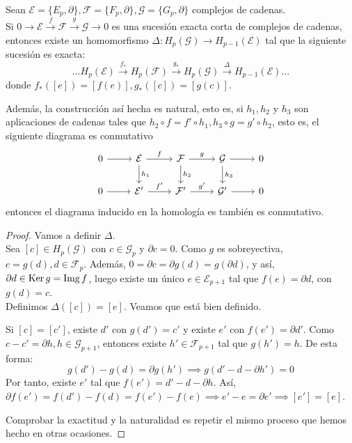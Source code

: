 \begin{theorem}
  Sean $\mathcal{E} = \{E_p, \partial\}, \mathcal{F} = \{F_p, \partial\}, \mathcal{G} = \{G_p, \partial\}$ complejos de cadenas. \\
  Si $0 \to \mathcal{E} \xrightarrow{f} \mathcal{F} \xrightarrow{g} \mathcal{G} \to 0$ es una sucesión exacta corta de complejos
  de cadenas, entonces existe un homomorfismo $\Delta \colon H_p(\mathcal{G}) \to H_{p-1}(\mathcal{E})$ tal que la siguiente
  sucesión es exacta:
  \[ \dots H_p(\mathcal{E}) \xrightarrow{f_*} H_p(\mathcal{F}) \xrightarrow{g_*} H_p(\mathcal{G}) \xrightarrow{\Delta} H_{p-1}(\mathcal{E}) \dots \]
  donde $f_*([e]) = [f(e)], g_*([c]) = [g(c)]$.

  Además, la construcción así hecha es natural, esto es, si $h_1, h_2$ y $h_3$ son aplicaciones de cadenas tales que
  $h_2 \circ f = f' \circ h_1, h_3 \circ g = g' \circ h_2$, esto es, el siguiente diagrama es conmutativo
  \[ \begin{tikzcd}
    0 \arrow{r} & \mathcal{E} \arrow{r}{f} \arrow{d}{h_1} & \mathcal{F} \arrow{r}{g} \arrow{d}{h_2} & \mathcal{G} \arrow{r} \arrow{d}{h_3} & 0 \\
    0 \arrow{r} & \mathcal{E'} \arrow{r}{f'} & \mathcal{F'} \arrow{r}{g'} & \mathcal{G'} \arrow{r} & 0
  \end{tikzcd} \]
  entonces el diagrama inducido en la homología es también es conmutativo.
\end{theorem}

\begin{proof}
  Vamos a definir $\Delta$. \\
  Sea $[c] \in H_p(\mathcal G)$ con $c \in \mathcal G_p$ y $\partial c = 0$. Como $g$ es sobreyectiva, $c = g(d), d \in \mathcal F_p$.
  Además, $0 = \partial c = \partial g(d) = g(\partial d)$, y así, $\partial d \in \operatorname{Ker} g = \operatorname{Img} f$, luego existe un único $e \in \mathcal E_{p+1}$
  tal que $f(e) = \partial d$, con $g(d) = c$. \\
  Definimos $\Delta([c]) = [e]$. Veamos que está bien definido.

  Si $[c] = [c']$, existe $d'$ con $g(d') = c'$ y existe $e'$ con $f(e') = \partial d'$. Como $c - c' = \partial h, h \in \mathcal G_{p+1}$,
  entonces existe $h' \in \mathcal F_{p+1}$ tal que $g(h') = h$. De esta forma:
  \[ g(d') - g(d) = \partial g(h') \implies g(d' - d - \partial h') = 0 \]
  Por tanto, existe $e'$ tal que $f(e') = d' - d - \partial h$. Así, $\partial f(e') = f(d') - f(d) = f(e') - f(e) \implies e' - e = \partial e'
  \implies [e'] = [e]$.

  Comprobar la exactitud y la naturalidad es repetir el mismo proceso que hemos hecho en otras ocasiones.
\end{proof}

